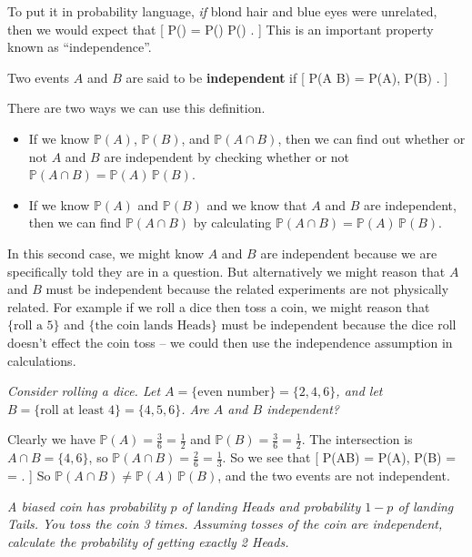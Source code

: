 \documentclass[
  letterpaper,
]{report}
\providecommand{\tightlist}{%
  \setlength{\itemsep}{0pt}\setlength{\parskip}{0pt}}\usepackage{longtable,booktabs,array}
\theoremstyle{definition}
\theoremstyle{definition}
\theoremstyle{remark}
\begin{document}
To put it in probability language, \emph{if} blond hair and blue eyes
were unrelated, then we would expect that {[}
\mathbb P() =
\mathbb P() \times \mathbb P() . {]}
This is an important property known as ``independence''.

Two events \(A\) and \(B\) are said to be \textbf{independent} if {[}
\mathbb P(A \cap B) = \mathbb P(A), \mathbb P(B) . {]}

There are two ways we can use this definition.

\begin{itemize}
\tightlist
\item
  If we know \(\mathbb P(A)\), \(\mathbb P(B)\), and
  \(\mathbb P(A \cap B)\), then we can find out whether or not \(A\) and
  \(B\) are independent by checking whether or not
  \(\mathbb P(A \cap B) = \mathbb P(A)\, \mathbb P(B)\).
\item
  If we know \(\mathbb P(A)\) and \(\mathbb P(B)\) and we know that
  \(A\) and \(B\) are independent, then we can find
  \(\mathbb P(A \cap B)\) by calculating
  \(\mathbb P(A \cap B) = \mathbb P(A)\, \mathbb P(B)\).
\end{itemize}

In this second case, we might know \(A\) and \(B\) are independent
because we are specifically told they are in a question. But
alternatively we might reason that \(A\) and \(B\) must be independent
because the related experiments are not physically related. For example
if we roll a dice then toss a coin, we might reason that
\(\{\text{roll a 5}\}\) and \(\{\text{the coin lands Heads}\}\) must be
independent because the dice roll doesn't effect the coin toss -- we
could then use the independence assumption in calculations.

\emph{Consider rolling a dice. Let
\(A = \{\text{even number}\} = \{2,4,6\}\), and let
\(B = \{\text{roll at least 4}\} = \{4,5,6\}\). Are \(A\) and \(B\)
independent?}

Clearly we have \(\mathbb P(A) = \frac36 = \frac12\) and
\(\mathbb P(B) = \frac 36 = \frac12\). The intersection is
\(A \cap B = \{4,6\}\), so \(\mathbb P(A \cap B) = \frac26 = \frac13\).
So we see that {[} \mathbb P(A\cap B) =  \qquad {}
\qquad  \mathbb P(A), \mathbb P(B) =  \times {} =  .
{]} So \(\mathbb P(A \cap B) \neq \mathbb P(A)\, \mathbb P(B)\), and the
two events are not independent.

\emph{A biased coin has probability \(p\) of landing Heads and
probability \(1-p\) of landing Tails. You toss the coin 3 times.
Assuming tosses of the coin are independent, calculate the probability
of getting exactly 2 Heads.}
\end{document}

